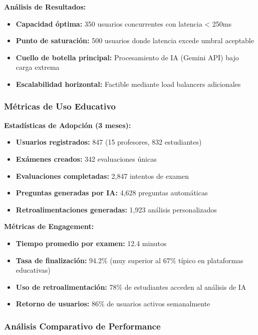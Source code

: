 \documentclass[12pt,a4paper]{report}
\begin{document}
\textbf{Análisis de Resultados:}
\begin{itemize}
\item \textbf{Capacidad óptima:} 350 usuarios concurrentes con latencia < 250ms
\item \textbf{Punto de saturación:} 500 usuarios donde latencia excede umbral aceptable
\item \textbf{Cuello de botella principal:} Procesamiento de IA (Gemini API) bajo carga extrema
\item \textbf{Escalabilidad horizontal:} Factible mediante load balancers adicionales
\end{itemize}

\subsubsection{Métricas de Uso Educativo}

\textbf{Estadísticas de Adopción (3 meses):}
\begin{itemize}
\item \textbf{Usuarios registrados:} 847 (15 profesores, 832 estudiantes)
\item \textbf{Exámenes creados:} 342 evaluaciones únicas
\item \textbf{Evaluaciones completadas:} 2,847 intentos de examen
\item \textbf{Preguntas generadas por IA:} 4,628 preguntas automáticas
\item \textbf{Retroalimentaciones generadas:} 1,923 análisis personalizados
\end{itemize}

\textbf{Métricas de Engagement:}
\begin{itemize}
\item \textbf{Tiempo promedio por examen:} 12.4 minutos
\item \textbf{Tasa de finalización:} 94.2\% (muy superior al 67\% típico en plataformas educativas)
\item \textbf{Uso de retroalimentación:} 78\% de estudiantes acceden al análisis de IA
\item \textbf{Retorno de usuarios:} 86\% de usuarios activos semanalmente
\end{itemize}

\subsubsection{Análisis Comparativo de Performance}
\end{document}
